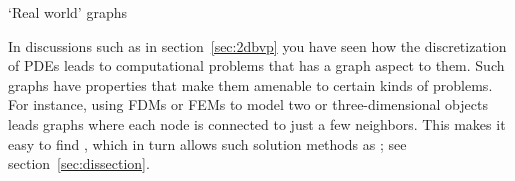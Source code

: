 \begin{comment}
\Level 1 {Sample implementation}

We assume that we have types \lstinline{vectorvalue} and \lstinline{matrixvalue}:
\begin{itemize}
\item
  vector values can take on a numerical value, or have a exceptional
  value \lstinline{undefined};
\item matrix values are \lstinline{empty}/\lstinline{filled}
  for \indextermsub{unweighted}{graph}s,
  or any numerical value for \indextermsub{weighted}{graph}s.
\end{itemize}

The most important part of the code is the matrix-vector multiplication;
we give the left multiplication since that is most common in graph computations.
%
\cxxverbatimsnippet{graphmultiply}
%
The multiplication routine takes two function pointers:
\begin{itemize}
\item a multiplication function for vector and matrix elements; and
\item an addition function for performing a reduction on vector elements.
\end{itemize}

We demonstrate this with two simple examples.
First we do a single matrix-vector multiplication,
with a matrix that connects each node to its successor
modulo the matrix size:
\[ m_{ij} = \delta_{i+1,j} \]
We apply this to a vector corresponding to a single vertex:
%
\snippetwithoutput{graphshift}{code/graph}{graph1}

In the second example we take the same matrix,
but now compute the single-source shortest path to each node.
This makes the multiplication and addition routines
marginally more complex:
%
\cxxverbatimsnippet{graphpathmultadd}

We now apply the matrix-vector multiplication
until we have found the distance to each vertex:
%
\snippetwithoutput{graphdistloop}{code/graph}{graph2}
\end{comment}

 {`Real world' graphs}

In discussions such as in section~\ref{sec:2dbvp} you have seen how
the discretization of \acp{PDE} leads to computational problems that
has a graph aspect to them. Such graphs have properties that make them
amenable to certain kinds of problems.
%
For instance, using \acp{FDM} or \acp{FEM} to model two or
three-dimensional objects leads graphs where each node is connected to
just a few neighbors. This makes it easy to find
, which in turn allows such solution methods as
; see section~\ref{sec:dissection}.

